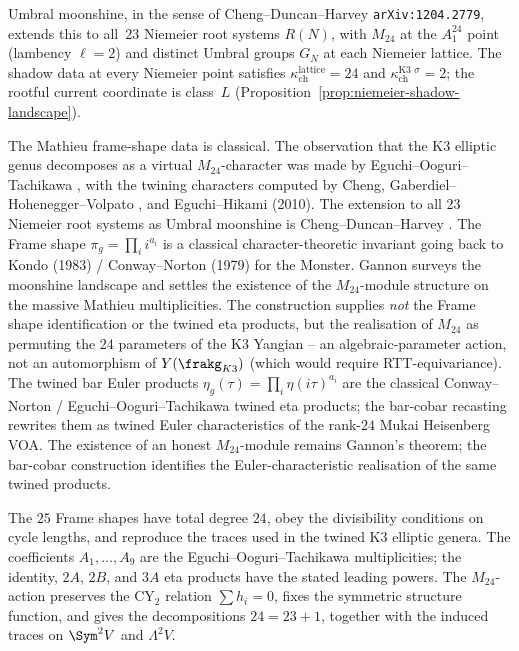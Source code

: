 \begin{conjecture}
Umbral moonshine, in the sense of Cheng--Duncan--Harvey
\texttt{arXiv:1204.2779}, extends this to all~$23$ Niemeier root
systems $R(N)$, with $M_{24}$ at the $A_1^{24}$ point (lambency $\ell = 2$)
and distinct Umbral groups $G_N$ at each Niemeier lattice. The shadow
data at every Niemeier point satisfies
$\kappa_{\mathrm{ch}}^{\text{lattice}} = 24$ and
$\kappa_{\mathrm{ch}}^{\text{K3 }\sigma} = 2$; the rootful current
coordinate is class~$L$
(Proposition~\ref{prop:niemeier-shadow-landscape}).
\end{conjecture}

\begin{remark}
\label{rem:mathieu-moonshine-frame-shape-classical}
The Mathieu frame-shape data is classical. The observation
that the K3 elliptic genus decomposes as a virtual $M_{24}$-character
was made by Eguchi--Ooguri--Tachikawa \cite{EguchiOoguriTachikawa2010},
with the twining characters computed by Cheng, Gaberdiel--Hohenegger--Volpato
\cite{GaberdielHoheneggerVolpato2010}, and Eguchi--Hikami (2010).
The extension to all 23 Niemeier root systems as Umbral moonshine is
Cheng--Duncan--Harvey \cite{ChengDuncanHarvey2014}. The Frame shape
$\pi_g = \prod_i i^{a_i}$ is a classical character-theoretic invariant
going back to Kondo (1983) / Conway--Norton (1979) for the Monster.
Gannon \cite{Gannon16} surveys the moonshine landscape and settles the
existence of the $M_{24}$-module structure on the massive Mathieu
multiplicities. The construction supplies \emph{not} the Frame
shape identification or the twined eta products, but the realisation
of $M_{24}$ as permuting the $24$ parameters of the K3 Yangian --
an algebraic-parameter action, not an automorphism of $Y(\frakg_{K3})$
(which would require RTT-equivariance). The twined bar Euler products
$\eta_g(\tau) = \prod_i \eta(i\tau)^{a_i}$ are the classical
Conway--Norton / Eguchi--Ooguri--Tachikawa twined eta products;
the bar-cobar recasting rewrites them as twined Euler characteristics
of the rank-$24$ Mukai Heisenberg VOA. The existence of an honest
$M_{24}$-module remains Gannon's theorem; the bar-cobar construction
identifies the Euler-characteristic realisation of the same twined
products.
\end{remark}
The \(25\) Frame shapes have total degree \(24\), obey the divisibility
conditions on cycle lengths, and reproduce the traces used in the
twined K3 elliptic genera. The coefficients \(A_1,\ldots,A_9\) are the
Eguchi--Ooguri--Tachikawa multiplicities; the identity, \(2A\), \(2B\),
and \(3A\) eta products have the stated leading powers. The
\(M_{24}\)-action preserves the CY\(_2\) relation \(\sum h_i=0\), fixes
the symmetric structure function, and gives the decompositions
\(24=23+1\), together with the induced traces on \(\Sym^2 V\) and
\(\Lambda^2 V\).

